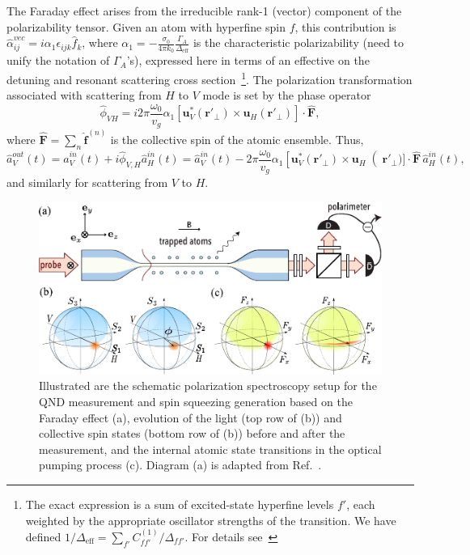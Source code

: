 \documentclass[preprint,aps,pra,onecolumn,superscriptaddress]{revtex4-1} %
\newcommand{\mbf}[1]{\mathbf{#1}}
\newcommand{\eff}{\text{eff}}
\newcommand{\comment}[1]{{\color{Maroon} #1}}
\begin{document}
The Faraday effect arises from the irreducible rank-1 (vector) component of the polarizability tensor.  Given an atom with hyperfine spin $f$, this contribution is $\hat{\alpha}^{vec}_{ij} = i \alpha_1 \epsilon_{ijk} \hat{f}_k$, where $\alpha_1 = -\frac{\sigma_0}{4\pi k_0 }\frac{\Gamma_A}{\Delta_{\eff}} $ is the characteristic polarizability \comment{(need to unify the notation of $ \Gamma_A $'s)}, expressed here in terms of an effective on the detuning and resonant scattering cross section~\footnote{The exact expression is a sum of excited-state hyperfine levels $f'$, each weighted by the appropriate oscillator strengths of the transition.  We have defined $1/\Delta_{\eff} = \sum_{f'} C^{(1)}_{ff'}/\Delta_{ff'}$. For details see~\cite{Qi2016}}.   The polarization transformation associated with scattering from $H$ to $V$ mode is set by the phase operator
\begin{equation}
\hat{\phi}_{VH} = i 2\pi \frac{\omega_0}{v_g}\alpha_1 \left[ \mbf{u}^*_V (\mbf{r}'_\perp) \times  \mbf{u}_{H} (\mbf{r}'_\perp) \right] \cdot \hat{\mbf{F}},
\end{equation}
where $\hat{\mbf{F}}=\sum_n \hat{\mbf{f}}^{(n)}$ is the collective spin of the atomic ensemble.  Thus,
\begin{equation}\label{eq:aoutain}
\hat{a}^{out}_V(t) = \hat{a}^{in}_V(t)  +i  \hat{\phi}_{V,H} \hat{a}^{in}_{H}(t)= \hat{a}^{in}_V(t)  - 2\pi \frac{\omega_0}{v_g}\alpha_1 \left[ \mbf{u}^*_V (\mbf{r}'_\perp) \times  \mbf{u}_{H}\right(\mbf{r}'_\perp)]  \cdot \hat{\mbf{F}}\, \hat{a}^{in}_{H}(t),
\end{equation}
 and similarly for scattering from $V$ to $H$.

\begin{figure}[htb]
\centering
  \includegraphics[width=.45\textwidth]{fig/FaradaySchematics}
  \caption{Illustrated are the schematic polarization spectroscopy setup for the QND measurement and spin squeezing generation based on the Faraday effect (a), evolution of the light (top row of (b)) and collective spin states (bottom row of (b)) before and after the measurement, and the internal atomic state transitions in the optical pumping process (c). Diagram (a) is adapted from Ref.~\cite{Qi2016}.}\label{fig:spinsqueezingschematic}
\end{figure}
\end{document}
